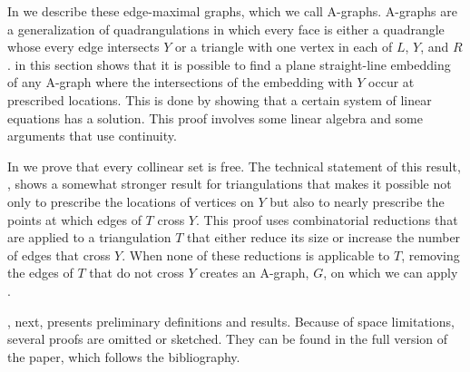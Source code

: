 In  we describe these edge-maximal graphs, which
we call A-graphs.  A-graphs are a generalization of quadrangulations in
which every face is either a quadrangle whose every edge intersects $Y$ or a triangle with one vertex in
each of $L$, $Y$, and $R$.   in this section shows that it
is possible to find a plane straight-line embedding of any A-graph where
the intersections of the embedding with $Y$ occur at prescribed locations.
This is done by showing that a certain system of linear equations has
a solution. This proof involves some linear algebra and some arguments
that use continuity.

In  we prove that every collinear set is free.
The technical statement of this result, , shows a somewhat
stronger result for triangulations that makes it possible not only to
prescribe the locations of vertices on $Y$ but also to nearly prescribe the
points at which edges of $T$ cross $Y$.  This proof uses combinatorial
reductions that are applied to a triangulation $T$ that either reduce its
size or increase the number of edges that cross $Y$.  When none of these
reductions is applicable to $T$, removing the edges of $T$ that do not
cross $Y$ creates an A-graph, $G$, on which we can apply .

, next, presents preliminary definitions and results. Because of space limitations, several proofs are omitted or sketched. They can be found in the full version of the paper, which follows the bibliography.
